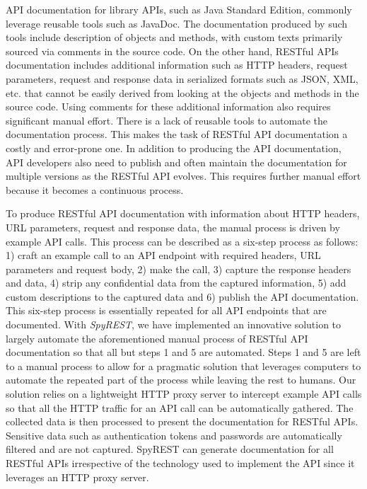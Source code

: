 \documentclass[conference]{IEEEtran}
\begin{document}
API documentation for library APIs, such as Java Standard Edition, commonly leverage reusable tools such as JavaDoc. The documentation produced by such tools include description of objects and methods, with custom texts primarily sourced via comments in the source code. On the other hand, RESTful APIs documentation includes additional information such as HTTP headers, request parameters, request and response data in serialized formats such as JSON, XML, etc. that cannot be easily derived from looking at the objects and methods in the source code. Using comments for these additional information also requires significant manual effort. There is a lack of reusable tools to automate the documentation process. This makes the task of RESTful API documentation a costly and error-prone one. In addition to producing the API documentation, API developers also need to publish and often maintain the documentation for multiple versions as the RESTful API evolves. This requires further manual effort because it becomes a continuous process.

To produce RESTful API documentation with information about HTTP headers, URL parameters, request and response data, the manual process is driven by example API calls. This process can be described as a six-step process as follows: 1) craft an example call to an API endpoint with required headers, URL parameters and request body, 2) make the call, 3) capture the response headers and data, 4) strip any confidential data from the captured information, 5) add custom descriptions to the captured data and 6) publish the API documentation. This six-step process is essentially repeated for all API endpoints that are documented. With \emph{SpyREST}, we have implemented an innovative solution to largely automate the aforementioned manual process of RESTful API documentation so that all but steps 1 and 5 are automated. Steps 1 and 5 are left to a manual process to allow for a pragmatic solution that leverages computers to automate the repeated part of the process while leaving the rest to humans. Our solution relies on a lightweight HTTP proxy server to intercept example API calls so that all the HTTP traffic for an API call can be automatically gathered. The collected data is then processed to present the documentation for RESTful APIs. Sensitive data such as authentication tokens and passwords are automatically filtered and are not captured. SpyREST can generate documentation for all RESTful APIs irrespective of the technology used to implement the API since it leverages an HTTP proxy server.
\end{document}
